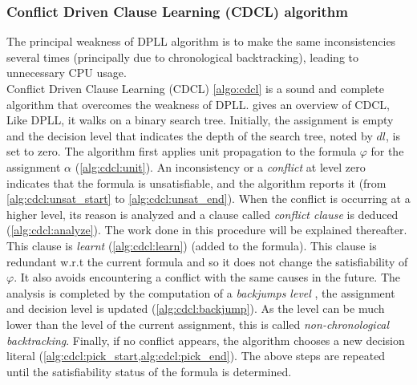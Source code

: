 \subsubsection{Conflict Driven Clause Learning (CDCL) algorithm}\label{sec:cdcl}
The principal weakness of DPLL algorithm is to make the same inconsistencies several times
(principally due to chronological backtracking), leading to  unnecessary CPU usage.\\
Conflict Driven Clause Learning (CDCL) \cref{algo:cdcl} is a sound and complete algorithm
that overcomes the weakness of DPLL.
 gives an overview of CDCL, Like DPLL,  it walks on a binary search tree.
Initially, the  assignment is empty and the decision level that 
indicates the depth of the search tree, noted by $dl$, is set to zero.
The algorithm first applies unit propagation to the formula $\varphi$ for the  assignment $\alpha$ (\cref{alg:cdcl:unit}).
An inconsistency or a \emph{conflict} at level zero indicates that the formula is unsatisfiable, and the algorithm
reports it (from \cref{alg:cdcl:unsat_start} to \cref{alg:cdcl:unsat_end}). When the conflict is occurring at a higher level, its reason is analyzed and a clause called \emph{conflict clause} is deduced (\cref{alg:cdcl:analyze}).
The work done in this procedure will be explained thereafter.
This clause is \emph{learnt} (\cref{alg:cdcl:learn}) (added to the formula). This clause is redundant w.r.t the current
formula and so it does not change the satisfiability of $\varphi$. It also avoids encountering a conflict with the same
causes in the future.
The analysis is completed by the computation of a \emph{backjumps level} , the assignment and decision level is updated (\cref{alg:cdcl:backjump}). As the level can be much lower than the level of the current assignment, this is called \emph{non-chronological backtracking}.
Finally, if no conflict appears, the algorithm chooses a new decision literal 
(\cref{alg:cdcl:pick_start,alg:cdcl:pick_end}).
The above steps are repeated until the satisfiability status of the
formula is determined.

